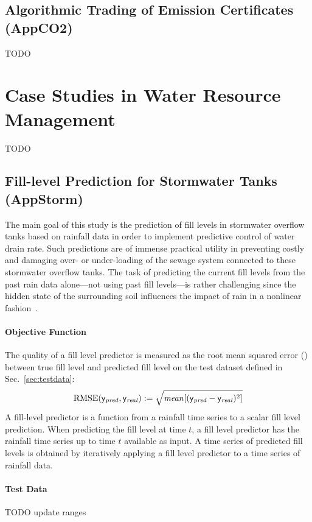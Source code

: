 \subsection{Algorithmic Trading  of Emission Certificates {\sf (AppCO2)}}
TODO

\lipsum[5]


\section{Case Studies in Water Resource Management}
TODO

\lipsum[6]

\subsection{Fill-level Prediction for Stormwater Tanks {\sf (AppStorm)}}
The main goal of this study is the prediction of fill levels in stormwater overflow tanks based on
rainfall data in order to implement predictive control of water drain rate. Such predictions are of
immense practical utility in preventing costly and damaging over- or under-loading of the sewage
system connected to these stormwater overflow tanks. The task of predicting the current fill levels
from the past rain data alone---not using past fill levels---is rather challenging since the hidden
state of the surrounding soil influences the impact of rain in a nonlinear
fashion~\citep{Bart08c,Kone08b}.

\paragraph{Objective Function}
The quality of a fill level predictor is measured as the root mean squared error (\RMSE) between
true fill level and predicted fill level on the test dataset defined in Sec.~\ref{sec:testdata}:
\begin{equation}\label{eq:rmse}
  \RMSE(\mathsf{y}_{\mathit{pred}}, \mathsf{y}_{\mathit{real}}) := %
    \sqrt{\mathit{mean}[(\mathsf{y}_{\mathit{pred}} - \mathsf{y}_{\mathit{real}})^2]}
\end{equation}
A fill-level predictor is a function from a rainfall time series to a scalar fill level
prediction. When predicting the fill level at time $t$, a fill level predictor has the rainfall time
series up to time $t$ available as input. A time series of predicted fill levels is obtained by
iteratively applying a fill level predictor to a time series of rainfall data.

\paragraph{Test Data}
TODO update ranges

